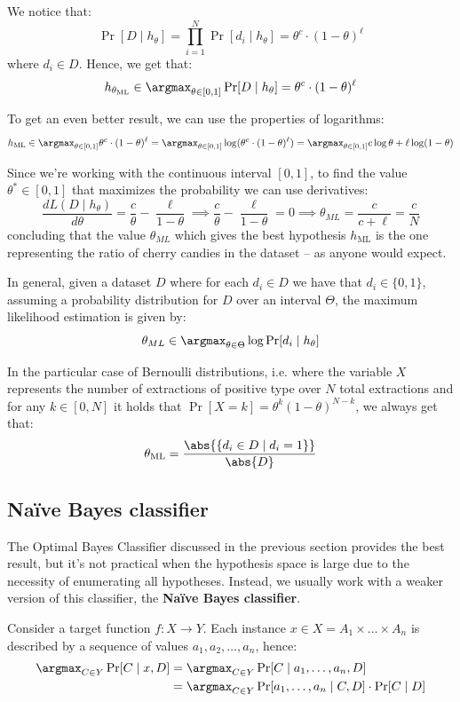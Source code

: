 \documentclass[a4paper, 12pt]{report}
\begin{document}
    We notice that:
    \[\Pr[D \mid h_\theta] = \prod_{i = 1}^N \Pr[d_i \mid h_\theta] = \theta^c \cdot (1-\theta)^\ell\]
    where $d_i \in D$. Hence, we get that:
    \[h_{\theta_\mathrm{ML}} \in \argmax_{\theta \in [0,1]} \Pr[D \mid h_\theta] = \theta^c \cdot (1-\theta)^\ell\]

    To get an even better result, we can use the properties of logarithms:
    \[h_{\mathrm{ML}} \in \argmax_{\theta \in [0,1]} \theta^c \cdot (1-\theta)^\ell = \argmax_{\theta \in [0,1]} \log (\theta^c \cdot (1-\theta)^\ell) = \argmax_{\theta \in [0,1]} c \log \theta + \ell \log (1-\theta)\]

    Since we're working with the continuous interval $[0,1]$, to find the value $\theta^* \in [0,1]$ that maximizes the probability we can use derivatives:
    \[\frac{d L(D \mid h_\theta)}{d \theta} = \frac{c}{\theta} - \frac{\ell}{1-\theta} \implies \frac{c}{\theta} - \frac{\ell}{1-\theta} = 0 \implies \theta_{ML} = \frac{c}{c+\ell} = \frac{c}{N}\]
    concluding that the value $\theta_{ML}$ which gives the best hypothesis $h_{\mathrm{ML}}$ is the one representing the ratio of cherry candies in the dataset -- as anyone would expect.

    In general, given a dataset $D$ where for each $d_i \in D$ we have that $d_i \in \{0, 1\}$, assuming a probability distribution for $D$ over an interval $\Theta$, the maximum likelihood estimation is given by:
    \[\theta_{ML} \in \argmax_{\theta \in \Theta} \log \Pr[d_i \mid h_\theta]\]

    In the particular case of Bernoulli distributions, i.e. where the variable $X$ represents the number of extractions of positive type over $N$ total extractions and for any $k \in [0,N]$ it holds that $\Pr[X = k] = \theta^k (1-\theta)^{N-k}$, we always get that:
    \[\theta_{\mathrm{ML}} = \frac{\abs{\{d_i \in D \mid d_i = 1\}}}{\abs{D}}\]

    \subsection{Naïve Bayes classifier}

    The Optimal Bayes Classifier discussed in the previous section provides the best result, but it's not practical when the hypothesis space is large due to the necessity of enumerating all hypotheses. Instead, we usually work with a weaker version of this classifier, the \textbf{Naïve Bayes classifier}.

    Consider a target function $f : X \to Y$. Each instance $x \in X = A_1 \times \ldots \times A_n$ is described by a sequence of values $a_1, a_2, \ldots , a_n$, hence:
    \[\begin{split}
        \argmax_{C \in Y} \Pr[C \mid x, D] &= \argmax_{C \in Y} \Pr[C \mid a_1, \ldots, a_n, D] \\
        &= \argmax_{C \in Y} \Pr[a_1, \ldots, a_n \mid C, D] \cdot \Pr[C \mid D]
    \end{split}\]
\end{document}
